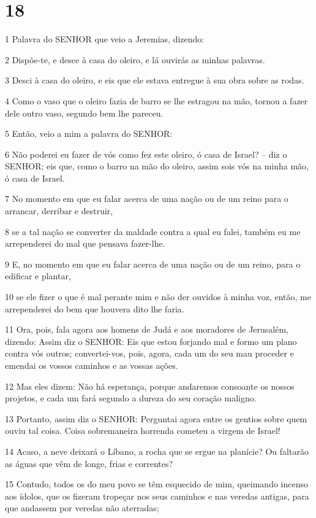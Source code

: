 \chapter{18}

\par 1 Palavra do SENHOR que veio a Jeremias, dizendo:
\par 2 Dispõe-te, e desce à casa do oleiro, e lá ouvirás as minhas palavras.
\par 3 Desci à casa do oleiro, e eis que ele estava entregue à sua obra sobre as rodas.
\par 4 Como o vaso que o oleiro fazia de barro se lhe estragou na mão, tornou a fazer dele outro vaso, segundo bem lhe pareceu.
\par 5 Então, veio a mim a palavra do SENHOR:
\par 6 Não poderei eu fazer de vós como fez este oleiro, ó casa de Israel? -- diz o SENHOR; eis que, como o barro na mão do oleiro, assim sois vós na minha mão, ó casa de Israel.
\par 7 No momento em que eu falar acerca de uma nação ou de um reino para o arrancar, derribar e destruir,
\par 8 se a tal nação se converter da maldade contra a qual eu falei, também eu me arrependerei do mal que pensava fazer-lhe.
\par 9 E, no momento em que eu falar acerca de uma nação ou de um reino, para o edificar e plantar,
\par 10 se ele fizer o que é mal perante mim e não der ouvidos à minha voz, então, me arrependerei do bem que houvera dito lhe faria.
\par 11 Ora, pois, fala agora aos homens de Judá e aos moradores de Jerusalém, dizendo: Assim diz o SENHOR: Eis que estou forjando mal e formo um plano contra vós outros; convertei-vos, pois, agora, cada um do seu mau proceder e emendai os vossos caminhos e as vossas ações.
\par 12 Mas eles dizem: Não há esperança, porque andaremos consoante os nossos projetos, e cada um fará segundo a dureza do seu coração maligno.
\par 13 Portanto, assim diz o SENHOR: Perguntai agora entre os gentios sobre quem ouviu tal coisa. Coisa sobremaneira horrenda cometeu a virgem de Israel!
\par 14 Acaso, a neve deixará o Líbano, a rocha que se ergue na planície? Ou faltarão as águas que vêm de longe, frias e correntes?
\par 15 Contudo, todos os do meu povo se têm esquecido de mim, queimando incenso aos ídolos, que os fizeram tropeçar nos seus caminhos e nas veredas antigas, para que andassem por veredas não aterradas;
